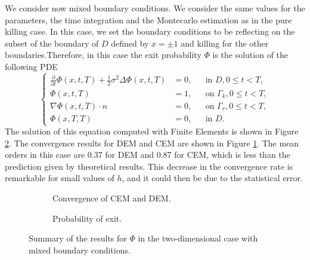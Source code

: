 We consider now mixed boundary conditions. We consider the same values for the parameters, the time integration and the Montecarlo estimation as in the pure killing case. In this case, we set the boundary conditions to be reflecting on the subset of the boundary of $D$ defined by $x = \pm 1$ and killing for the other boundaries.Therefore, in this case the exit probability $\Phi$ is the solution of the following PDE
\begin{equation}\label{eq:PDEPhi2DRefl}
	\left \{
  	\begin{aligned}
	\frac{\partial}{\partial t} \Phi(x,t,T) + \frac{1}{2} \sigma^2 \Delta \Phi(x,t,T) &= 0, && \text{in } D, 0 \leq t < T,\\
	\Phi(x,t,T) &= 1, && \text{on } \Gamma_k, 0 \leq t < T,\\
	\nabla \Phi(x,t,T) \cdot n &= 0, && \text{on } \Gamma_r, 0 \leq t < T,\\
	\Phi(x,T,T) &= 0, && \text{in } D.
  	\end{aligned} \right.
\end{equation}
The solution of this equation computed with Finite Elements is shown in Figure \ref{fig:PhiExact2DRefl}. The convergence results for DEM and CEM are shown in Figure \ref{fig:ReflTwoDPhi}. The mean orders in this case are 0.37 for DEM and 0.87 for CEM, which is less than the prediction given by theoretical results. This decrease in the convergence rate is remarkable for small values of $h$, and it could then be due to the statistical error.

\begin{figure}[t]
    \centering
    \begin{subfigure}{0.49\linewidth}
        \centering
        \resizebox{1\linewidth}{!}{ }  
        \caption{Convergence of CEM and DEM.}
        \label{fig:ReflTwoDPhi}
    \end{subfigure}
    \begin{subfigure}{0.49\linewidth}
        \centering
        \resizebox{1\linewidth}{!}{ }  
        \caption{Probability of exit.}
        \label{fig:PhiExact2DRefl}
    \end{subfigure}    
    \caption{Summary of the results for $\Phi$ in the two-dimensional case with mixed boundary conditions.}
    \label{fig:OrdersTwoDKillPhi}
\end{figure}
